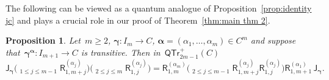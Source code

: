 \documentclass[12pt, reqno]{amsart}
\newcommand{\sfR}{\mathsf{R}}
\newtheorem{proposition}[theorem]{Proposition}
\theoremstyle{definition}
\newcommand{\dscprod}{\mathop{\overleftarrow{\prod}}}
\numberwithin{equation}{section}
\begin{document}
The following can be viewed as a quantum analogue of Proposition~\ref{prop:identity jc} 
and plays a crucial role in our proof of Theorem~\ref{thm:main thm 2}.
\begin{proposition}\label{prop:key relation}
Let~$m\ge 2$, $\boldsymbol\gamma:I_m\to C$, $\boldsymbol\alpha=(\alpha_1,\dots,\alpha_m)\in C^m$
and suppose that~$\boldsymbol\gamma^{\boldsymbol\alpha}:I_{m+1}\to C$ is transitive. Then in~$\mathsf{QTr}^+_{2m-1}(C)$
\begin{equation}
\mathsf J_{\boldsymbol\gamma}\Big(\dscprod_{1\le j\le m-1}
\sfR_{1,m+j}^{(\alpha_j)}\Big)\Big(\dscprod_{2\le j\le m}
\sfR_{1,j}^{(\alpha_j)}\Big)
=\sfR_{1,m}^{(\alpha_m)}\Big(\dscprod_{2\le j\le m-1}
\sfR_{1,m+j}^{(\alpha_j)}\sfR_{1,j}^{(\alpha_j)}\Big)\sfR_{1,m+1}^{(\alpha_1)}\,
\mathsf J_{\boldsymbol\gamma}.\label{eq:compressed-monoid}
\end{equation}
\end{proposition}
\end{document}
